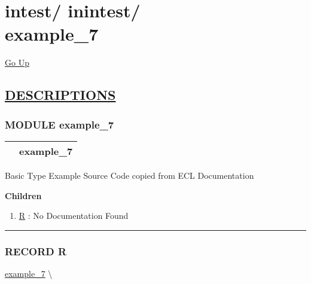 \chapter*{\color{headfile}
{\large intest\slash\hspace{0pt}}
{\large inintest\slash\hspace{0pt}}
 \\
example_7
}
\hypertarget{ecldoc:toc:intest.inintest.example_7}{}
\hyperlink{ecldoc:toc:root/intest/inintest}{Go Up}


\section*{\underline{\textsf{DESCRIPTIONS}}}
\subsection*{\textsf{\colorbox{headtoc}{\color{white} MODULE}
example\_7}}

\hypertarget{ecldoc:intest.inintest.example_7}{}

{\renewcommand{\arraystretch}{1.5}
\begin{tabularx}{\textwidth}{|>{\raggedright\arraybackslash}l|X|}
\hline
\hspace{0pt}\mytexttt{\color{red} } & \textbf{example\_7} \\
\hline
\end{tabularx}
}

\par





Basic Type Example Source Code copied from ECL Documentation







\textbf{Children}
\begin{enumerate}
\item \hyperlink{ecldoc:intest.inintest.example_7.r}{R}
: No Documentation Found
\end{enumerate}

\rule{\linewidth}{0.5pt}

\subsection*{\textsf{\colorbox{headtoc}{\color{white} RECORD}
R}}

\hypertarget{ecldoc:intest.inintest.example_7.r}{}
\hspace{0pt} \hyperlink{ecldoc:intest.inintest.example_7}{example_7} \textbackslash 

